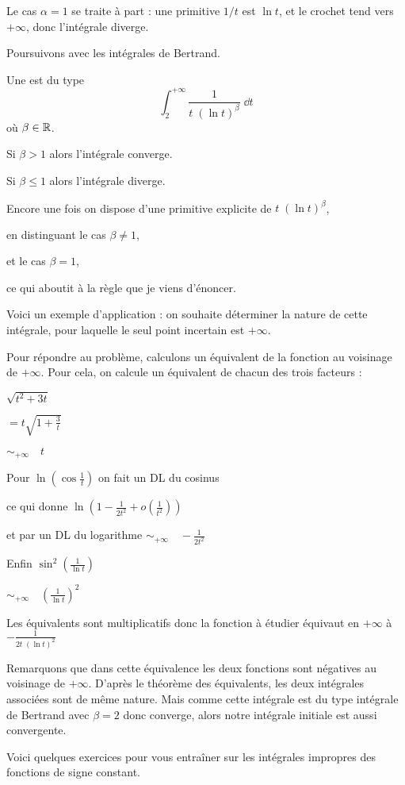 \change
Le cas $\alpha =1$ se traite à part :
une primitive $1/t$ est $\ln t$, et le crochet tend vers $+\infty$, donc 
l'intégrale diverge.



\diapo

Poursuivons avec les intégrales de Bertrand.

Une  est  du type
$$\int_2^{+\infty} \frac{1}{t\;(\ln t)^{\beta}}\;\dd t$$
où $\beta \in \mathbb{R}$.

\change
Si $\beta > 1$ alors  l'intégrale converge.

\change
Si $\beta \le 1$ alors  l'intégrale diverge.

\change

\change
Encore une fois on dispose d'une primitive explicite de 
$t\;(\ln t)^{\beta}$, 

\change
en distinguant le cas $\beta \neq 1$,

\change
et le cas $\beta=1$,

ce qui aboutit à la règle que je viens d'énoncer.

\diapo

Voici un exemple d'application :
on souhaite déterminer la nature de 
cette intégrale, pour laquelle le seul point incertain est $+\infty$.

Pour répondre au problème, calculons un équivalent de la fonction au voisinage de $+\infty$.
Pour cela, on calcule un équivalent de chacun des trois facteurs :

\change
$\sqrt{t^2+3t}$

\change
$= t\sqrt{1+\frac{3}{t}}$

\change
$\mathop{\sim}_{+\infty}\quad   t$


\change
Pour $\ln\left(\cos\frac{1}{t}\right)$ on fait un DL du cosinus

\change
ce qui donne $\ln\left(1-\frac{1}{2t^2}+o\left(\frac{1}{t^2}\right)\right)$

\change
et par un DL du logarithme
$\mathop{\sim}_{+\infty}\quad  -\frac{1}{2t^2}$

\change
Enfin 
$\sin^2\left(\frac{1}{\ln t}\right)$

\change
$\mathop{\sim}_{+\infty}\quad \left(\frac{1}{\ln t}\right)^2$

\change
Les équivalents sont multiplicatifs
donc la fonction à étudier équivaut en $+\infty$ à $-\frac{1}{2t\;(\ln t)^2}$


\change
Remarquons que dans cette équivalence les deux fonctions sont négatives 
au voisinage de $+\infty$. 
D'après le théorème des équivalents,
les deux intégrales associées sont de même nature.
Mais comme cette intégrale est du type intégrale de Bertrand 
avec $\beta=2$ donc converge, 
alors notre intégrale initiale est aussi convergente.


\diapo

Voici quelques exercices pour vous entraîner 
sur les intégrales impropres des fonctions de signe constant.


